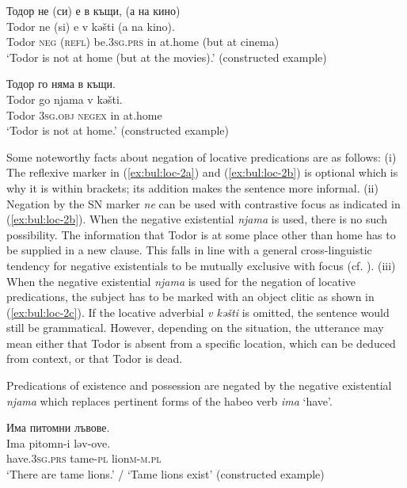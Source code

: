 \documentclass[output=paper,colorlinks=true, citecolor=brown]{langscibook}
\begin{document}
  \ex Тодор не (си) е в къщи, (а на кино)\label{ex:bul:loc-2b}\\ 
  	\gll Todor ne (si) e v kəšti (a na kino).\\
     Todor \textsc{neg} (\textsc{refl}) be.\textsc{3sg.prs} in at.home (but at cinema)\\
\glt `Todor is not at home (but at the movies).' (constructed example)

  \ex Тодор го няма в къщи.\label{ex:bul:loc-2c}\\ 
  	\gll Todor go njama v kəšti.\\
     Todor \textsc{3sg.obj} \textsc{negex} in at.home\\
\glt `Todor is not at home.' (constructed example)

\z \z

Some noteworthy facts about negation of locative predications are as follows: (i) The reflexive marker in (\ref{ex:bul:loc-2a}) and (\ref{ex:bul:loc-2b}) is optional which is why it is within brackets; its addition makes the sentence more informal. (ii) Negation by the SN marker \textit{ne} can be used with contrastive focus as indicated in (\ref{ex:bul:loc-2b}). When the negative existential \textit{njama} is used, there is no such possibility. The information that Todor is at some place other than home has to be supplied in a new clause. This falls in line with a general cross-linguistic tendency for negative existentials to be mutually exclusive with focus (cf. \cite{Veselinova2013neg.exist}). (iii) When the negative existential \textit{njama} is used for the negation of locative predications, the subject has to be marked with an object clitic as shown in (\ref{ex:bul:loc-2c}). If the locative adverbial \textit{v kəšti} is omitted, the sentence would still be grammatical. However, depending on the situation, the utterance may mean either that Todor is absent from a specific location, which can be deduced from context, or that Todor is dead.

Predications of existence and possession are negated by the negative existential \textit{njama} which replaces pertinent forms of the habeo verb \textit{ima} `have'.

\ea  \label{ex:bul:exn-1}
  \ea Има питомни лъвове.\label{ex:bul:exn-1a}\\ 
  	\gll Ima pitomn-i ləv-ove.\\
     have.\textsc{3sg.prs} tame-\textsc{pl} lion\textsc{m}-\textsc{m.pl}\\
\glt `There are tame lions.' / `Tame lions exist' (constructed example)
\end{document}
